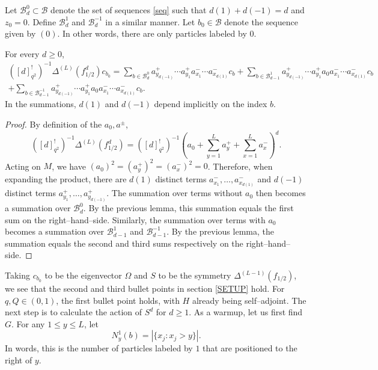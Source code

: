 \documentclass[12pt]{ximera}
\begin{document}
Let $\mathcal{B}^0_d\subset \mathcal{B}$ denote the set of sequences \eqref{seq} such that $d(1) + d(-1) = d$ and $z_0=0$. Define $\mathcal{B}^1_d$ and $\mathcal{B}^{-1}_d$ in a similar manner. Let $b_0 \in \mathcal{B}$ denote the sequence given by $(0)$. In other words, there are only particles labeled by $0$.
\begin{lemma}
For every $d \geq 0$,
\begin{multline*}
([d]_{q^2}^! )^{-1} \Delta^{(L)}(f_{1/2}^d) c_{b_0}  = \sum_{b \in \mathcal{B}_d^0} a_{y_{d(-1)}}^+\cdots a_{y_{1}}^+ a_{x_1}^- \cdots a_{x_{d(1)}}^-  c_b+ \sum_{b \in \mathcal{B}_{d-1}^1} a_{y_{d(-1)}}^+\cdots a_{y_{1}}^+ a_0 a_{x_1}^- \cdots a_{x_{d(1)}}^- c_b\\
+ \sum_{b \in \mathcal{B}_{d-1}^{-1}}  a_{y_{d(-1)}}^+\cdots a_{y_{1}}^+ a_0 a_{x_1}^- \cdots a_{x_{d(1)}}^- c_b.
\end{multline*}
In the summations, $d(1)$ and $d(-1)$ depend implicitly on the index $b$. 
\end{lemma}
\begin{proof}
By definition of the $a_0,a^{\pm}$, 
$$
([d]_{q^2}^! )^{-1}\Delta^{(L)}(f_{1/2}^d) = ([d]_{q^2}^! )^{-1}\left( a_0 + \sum_{y=1}^L a_y^+ + \sum_{x=1}^L a_x^-\right)^d.
$$
Acting on $M$, we have $(a_0)^2 = (a_y^+)^2 = (a_x^-)^2=0$. Therefore, when expanding the product, there are $d(1)$ distinct terms $a^-_{x_1},\ldots, a^-_{x_{d(1)}}$ and $d(-1)$ distinct terms $a^+_{y_1},\ldots, a^+_{y_{d(-1)}}$. The summation over terms without $a_0$ then becomes a summation over $\mathcal{B}_d^0$. By the previous lemma, this summation equals the first sum on the right--hand--side. Similarly, the summation over terms with $a_0$ becomes a summation over $\mathcal{B}_{d-1}^1$ and $\mathcal{B}_{d-1}^{-1}$. By the previous lemma, the summation equals the second and third sums respectively on the right--hand--side. 

\end{proof}

Taking $c_{b_0}$ to be the eigenvector $\Omega$ and $S$ to be the symmetry $\Delta^{(L-1)}(f_{1/2})$, we see that the second and third bullet points in section \ref{SETUP} hold. For $q,Q \in (0,1)$, the first bullet point holds, with $H$ already being self--adjoint.  The next step is to calculate the action of $S^d$ for $d\geq 1$. As a warmup, let us first find $G$. For any $1 \leq y \leq L$, let 
$$
N_y^1(b) = \left| \{ x_j: x_j > y\} \right|.
$$
In words, this is the number of particles labeled by $1$ that are positioned to the right of $y$. 
\end{document}
